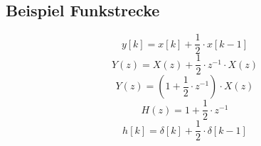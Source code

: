 \documentclass[a4paper, 10pt, fleqn]{article}
\begin{document}
\subsection{Beispiel Funkstrecke}
\[ y[k] = x[k] + \frac{1}{2} \cdot x[k - 1] \]
\[ Y(z) = X(z) + \frac{1}{2} \cdot z^{-1} \cdot X(z) \]
\[ Y(z) = \left( 1 + \frac{1}{2} \cdot z^{-1} \right) \cdot X(z) \]
\[ H(z) = 1 + \frac{1}{2} \cdot z^{-1} \]
\[ h[k] = \delta[k] + \frac{1}{2} \cdot \delta[k - 1] \]
\end{document}
